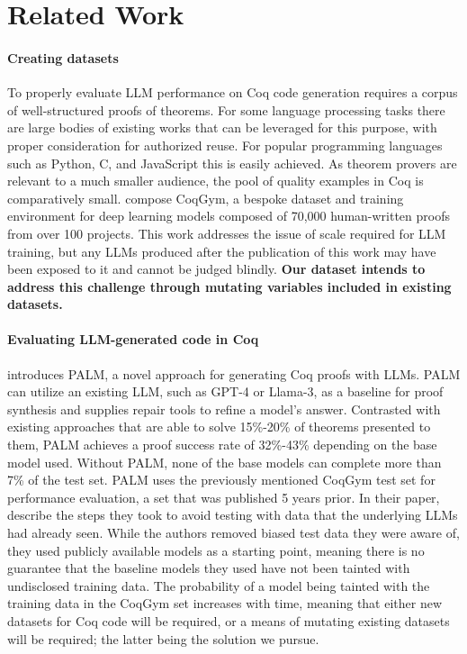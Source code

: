 
\section{Related Work}
\label{sec:related-work}


\paragraph{Creating datasets}
To properly evaluate LLM performance on
Coq code generation requires a corpus of well-structured
proofs of theorems. For some language processing tasks
there are large bodies of existing works that can be leveraged for this purpose, 
with proper consideration for authorized reuse.
For popular programming
languages such as Python, C, and JavaScript this is easily achieved.
As theorem provers are relevant to a much smaller audience, the pool of quality examples in Coq is
comparatively small.
\citet{learningtoprove} compose CoqGym,
a bespoke dataset and training environment for deep learning models
composed of 70,000 human-written proofs from over 100 projects.
This work addresses the issue of scale required for LLM training,
but any LLMs produced
after the publication of this work
may have been exposed to it and cannot be judged blindly.
\textbf{Our dataset intends to address this challenge through mutating variables included in existing datasets.}

\paragraph{Evaluating LLM-generated code in Coq}
\citet{proofautomationwithllms} introduces PALM,
a novel approach for generating Coq proofs with LLMs.
PALM can utilize an existing LLM, such as GPT-4 or Llama-3,
as a baseline for proof synthesis and supplies repair tools
to refine a model's answer.
Contrasted with existing approaches that are able
to solve 15\%-20\% of theorems presented to them,
PALM achieves a proof success rate of 32\%-43\% 
depending on the base model used.
Without PALM, none of the base models can
complete more than 7\% of the test set.
PALM uses the previously mentioned CoqGym test set
for performance evaluation, 
a set that was published 5 years prior. 
In their paper, \citeauthor{proofautomationwithllms} describe the steps 
they took to avoid testing with data 
that the underlying LLMs had already seen.  
While the authors removed biased test data they were aware of, 
they used publicly available models as a starting point, 
meaning there is no guarantee that the baseline models 
they used have not been tainted with undisclosed training data. 
The probability of a model being tainted 
with the training data in the CoqGym set increases with time, 
meaning that either new datasets for Coq code will be required, 
or a means of mutating existing datasets will be required; 
the latter being the solution we pursue.


